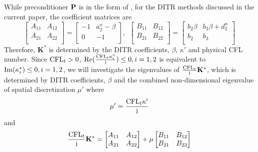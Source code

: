 While preconditioner $\mathbf{P}$ is in the form of ,
for the DITR methods discussed in the current paper,
the coefficient matrices are
\begin{equation}
    \begin{bmatrix}
        A_{11} & A_{12} \\
        A_{21} & A_{22} \\
    \end{bmatrix} = \begin{bmatrix}
        -1 & a_2^n - \beta \\
        0  & -1            \\
    \end{bmatrix},\ \
    \begin{bmatrix}
        B_{11} & B_{12} \\
        B_{21} & B_{22} \\
    \end{bmatrix} = \begin{bmatrix}
        b_2\beta & b_3\beta + d_2^n \\
        b_2      & b_3              \\
    \end{bmatrix}
    \label{eq:ABBetaForm}
\end{equation}
Therefore, $\mathbf{K}^*$ is determined by the DITR coefficients,
$\beta$, $\kappa'$ and physical CFL number.
Since $\text{CFL}_t > 0$, $\mathrm{Re}(\frac{\text{CFL}_t\kappa^*_i}{\mathrm{i}}) \leq 0, i=1,2$
is equivalent to $\mathrm{Im}(\kappa^*_i) \leq 0, i=1,2$,
we will investigate the eigenvalues of
$\frac{\text{CFL}_t}{\mathrm{i}}\mathbf{K}^*$, which is
determined by DITR coefficients, $\beta$ and the
combined non-dimensional eigenvalue of spatial  discretization $\mu'$
where
\begin{equation}
    \mu' = \frac{\text{CFL}_t \kappa'}{\mathrm{i}}
\end{equation}
and
\begin{equation}
    \frac{\text{CFL}_t}{\mathrm{i}}\mathbf{K}^* = \begin{bmatrix}
        A_{11} & A_{12} \\
        A_{21} & A_{22} \\
    \end{bmatrix} + \mu \begin{bmatrix}
        B_{11} & B_{12} \\
        B_{21} & B_{22} \\
    \end{bmatrix}
\end{equation}

